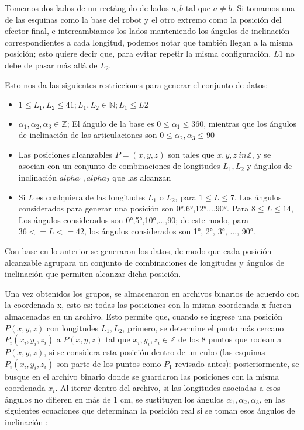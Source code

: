 Tomemos dos lados de un rectángulo de lados $a,b$ tal que $a \neq b$. Si tomamos una de las esquinas como la base del robot y el otro extremo como la posición del efector final, e intercambiamos los lados manteniendo los ángulos de inclinación correspondientes a cada longitud, podemos notar que también llegan a la misma posición; esto quiere decir que, para evitar repetir la misma configuración, $L1$ no debe de pasar más allá de $L_2$.

Esto nos da las siguientes restricciones para generar el conjunto de datos:

\begin{itemize}
	
	\item $ 1 \leq L_1, L_2 \leq 41; L_1, L_2 \in \mathbb{N}; L_1 \leq L2$ 
	
	\item $\alpha_1, \alpha_2, \alpha_3 \in \mathbb{Z}$; El ángulo de la base es $ 0 \leq \alpha_1 \leq 360$, mientras que los ángulos de inclinación de las articulaciones son $ 0 \leq \alpha_2, \alpha_3 \leq 90$
	
	\item Las posiciones alcanzables $P = (x, y, z)$ son tales que $x,y,z \ in \mathbb{Z}$, y se asocian con un conjunto de combinaciones de longitudes $L_1, L_2$ y ángulos de inclinación $alpha_1, alpha_2$ que las alcanzan
	
	\item Si $L$ es cualquiera de las longitudes $L_1$ o $L_2$, para $1 \leq L \leq 7$, Los ángulos considerados para generar una posición son 0°,6°,12°...,90°. Para $8 \leq L \leq 14$, Los ángulos considerados son 0°,5°,10°,...,90; de este modo, para $36 <= L <= 42$, los ángulos considerados son 1°, 2°, 3°, ..., 90°.
	
\end{itemize}

Con base en lo anterior se generaron los datos, de modo que cada posición alcanzable agrupara un conjunto de combinaciones de longitudes y ángulos de inclinación que permiten alcanzar dicha posición.

Una vez obtenidos los grupos, se almacenaron en archivos binarios de acuerdo con la coordenada x, esto es: todas las posiciones con la misma coordenada x fueron almacenadas en un archivo. Esto permite que, cuando se ingrese una posición $P(x,y,z)$ con longitudes $L_1, L_2$, primero, se determine el punto más cercano $P_i(x_i,y_i,z_i)$ a $P(x,y,z)$ tal que $x_i,y_i,z_i \in \mathbb{Z}$ de los 8 puntos que rodean a $P(x,y,z)$, si se considera esta posición dentro de un cubo (las esquinas $P_i(x_i,y_i,z_i)$ son parte de los puntos como $P_1$ revisado antes); posteriormente, se busque en el archivo binario donde se guardaron las posiciones con la misma coordenada $x_i$. Al iterar dentro del archivo,  si las longitudes asociadas a esos ángulos no difieren en más de 1 cm, se sustituyen los ángulos $\alpha_1, \alpha_2, \alpha_3$, en las siguientes ecuaciones que determinan la posición real si se toman esos ángulos de inclinación :

